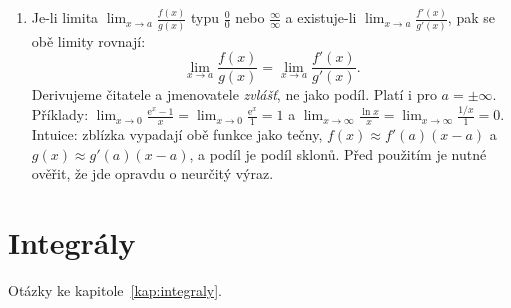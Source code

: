 \begin{enumerate}[label=\textbf{\arabic*.}, leftmargin=*, itemsep=0.8em]
  \item {}
  Je-li limita $\lim_{x\to a}\frac{f(x)}{g(x)}$ typu $\frac{0}{0}$ nebo $\frac{\infty}{\infty}$ a existuje-li $\lim_{x\to a}\frac{f'(x)}{g'(x)}$, pak se obě limity rovnají:
  \begin{equation*}
    \lim_{x\to a}\frac{f(x)}{g(x)} = \lim_{x\to a}\frac{f'(x)}{g'(x)}.
  \end{equation*}
  Derivujeme čitatele a jmenovatele \emph{zvlášť}, ne jako podíl. Platí i pro $a = \pm\infty$. Příklady: $\lim_{x\to 0}\frac{\mathrm{e}^x - 1}{x} = \lim_{x\to 0}\frac{\mathrm{e}^x}{1} = 1$ a $\lim_{x\to\infty}\frac{\ln x}{x} = \lim_{x\to\infty}\frac{1/x}{1} = 0$. Intuice: zblízka vypadají obě funkce jako tečny, $f(x)\approx f'(a)(x - a)$ a $g(x)\approx g'(a)(x - a)$, a podíl je podíl sklonů. Před použitím je nutné ověřit, že jde opravdu o neurčitý výraz. 
\end{enumerate}

\section{Integrály}

Otázky ke kapitole~\ref{kap:integraly}.

